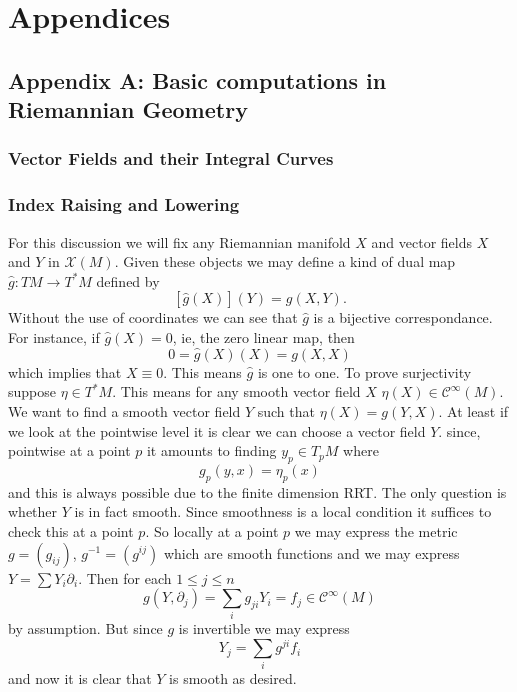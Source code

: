 \chapter{Appendices}
\section{Appendix A: Basic computations in Riemannian Geometry}

\subsection{Vector Fields and their Integral Curves}

\subsection{Index Raising and Lowering}

For this discussion we will fix any Riemannian manifold $X$ and vector fields $X$ and $Y$ in $\mathcal{X}(M)$. Given these objects we may define a kind of dual map $\hat{g}: TM \to T^*M$ defined by
\[[\hat{g}(X)](Y) = g(X, Y).\] Without the use of coordinates we can see that $\hat{g}$ is a bijective correspondance. For instance, if $\hat{g}(X) = 0$, ie, the zero linear map, then 
\[0 = \hat{g}(X)(X) = g(X, X)\] which implies that $X \equiv 0$. This means $\hat{g}$ is one to one. To prove surjectivity suppose $\eta \in T^*M$. This means for any smooth vector field $X$ $\eta(X) \in \mathcal{C}^\infty(M)$. We want to find a smooth vector field $Y$ such that $\eta(X) = g(Y, X)$. At least if we look at the pointwise level it is clear we can choose a vector field $Y$. since, pointwise at a point $p$ it amounts to finding $y_p \in T_pM$ where
\[g_p(y, x) = \eta_p(x)\]
and this is always possible due to the finite dimension RRT. The only question is whether $Y$ is in fact smooth. Since smoothness is a local condition it suffices to check this at a point $p$. So locally at a point $p$ we may express the metric $g = (g_{ij})$, $g^{-1} = (g^{ij})$ which are smooth functions and we may express $Y = \sum Y_i \partial_i$. Then for each $1 \leq j \leq n$
\[g(Y, \partial_j) = \sum_i g_{ji}Y_i = f_j \in \mathcal{C}^{\infty}(M)\] by assumption. But since $g$ is invertible we may express 
\[Y_j = \sum_{i}g^{ji}f_i\]
and now it is clear that $Y$ is smooth as desired.

